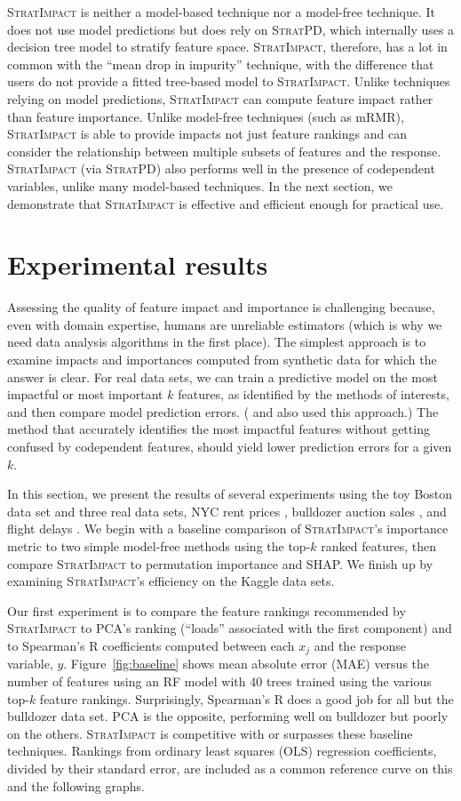 \documentclass[11pt]{article}
\newcommand{\figref}[1]{Figure~\ref{#1}}
\newcommand{\simp}{\fontfamily{cmr}\textsc{\small StratImpact}}
\newcommand{\spd}{\fontfamily{cmr}\textsc{\small StratPD}}
\begin{document}
\simp{} is neither a model-based technique nor a model-free technique. It does not use model predictions but does rely on \spd, which internally uses a decision tree model to stratify feature space. \simp{}, therefore, has a lot in common with the ``mean drop in impurity'' technique, with the difference that users do not provide a fitted tree-based model to \simp.
Unlike techniques relying on model predictions, \simp{} can compute feature impact rather than feature importance. Unlike model-free techniques (such as mRMR), \simp{} is able to provide impacts not just feature rankings and can consider the relationship between multiple subsets of features and the response.   \simp{} (via \spd) also performs well in the presence of codependent variables, unlike many model-based techniques. In the next section, we demonstrate that \simp{} is effective and efficient enough for practical use.

\section{Experimental results}\label{sec:experiments}

Assessing the quality of feature impact and importance is challenging because, even with domain expertise, humans are unreliable estimators (which is why we need data analysis algorithms in the first place).  The simplest approach is to examine impacts and importances computed from synthetic data for which the answer is clear.  For real data sets, we can train a predictive model on the most impactful or most important $k$ features, as identified by the methods of interests, and then compare model prediction errors. (\citealt{mRMR} and \citealt{tsanas} also used this approach.) The method that accurately identifies the most impactful features without getting confused by codependent features, should yield lower prediction errors for a given $k$. 

In this section, we present the results of several experiments using the toy Boston data set and three real data sets, NYC rent prices \citep{rent}, bulldozer auction sales \citep{bulldozer}, and flight delays \citep{flights}. We begin with a baseline comparison of \simp{}'s importance metric to two simple model-free methods using the top-$k$ ranked features, then compare \simp{} to permutation importance and SHAP. We finish up by examining \simp's efficiency on the Kaggle data sets.

Our first experiment is to compare the feature rankings recommended by \simp{} to PCA's ranking (``loads'' associated with the first component) and to Spearman's R coefficients computed between each $x_j$ and the response variable, $y$. \figref{fig:baseline} shows mean absolute error  (MAE) versus the number of features using an RF model with 40 trees trained using the various top-$k$ feature rankings. Surprisingly, Spearman's R does a good job for all but the bulldozer data set. PCA is the opposite, performing well on bulldozer but poorly on the others. \simp{} is competitive with or surpasses these baseline techniques.  Rankings from ordinary least squares (OLS) regression coefficients, divided by their standard error, are included as a common reference curve on this and the following graphs. 
\end{document}
